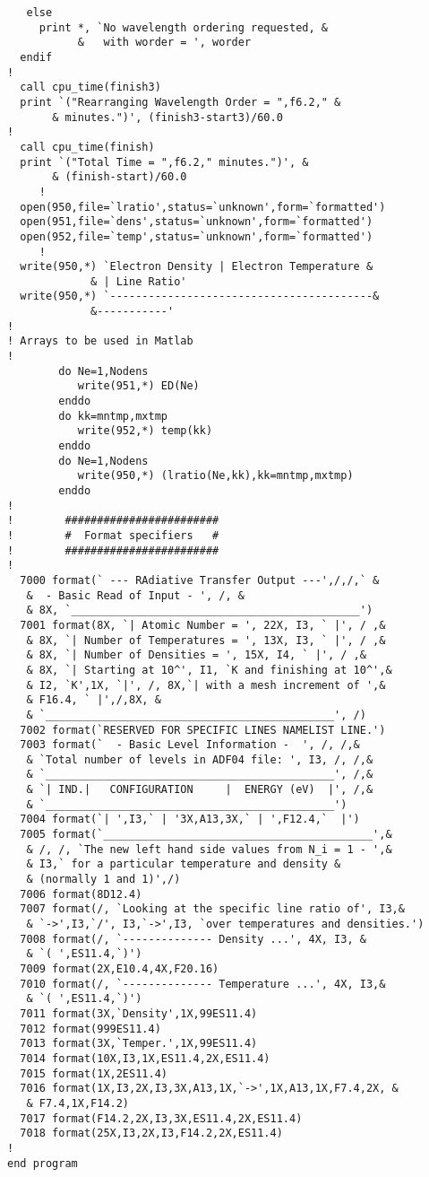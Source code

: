 \begin{appendices}
\begin{verbatim}
   else
     print *, `No wavelength ordering requested, &
           &   with worder = ', worder
  endif
!
  call cpu_time(finish3)
  print `("Rearranging Wavelength Order = ",f6.2," &
       & minutes.")', (finish3-start3)/60.0
!
  call cpu_time(finish)
  print `("Total Time = ",f6.2," minutes.")', &
       & (finish-start)/60.0
     !
  open(950,file=`lratio',status=`unknown',form=`formatted')
  open(951,file=`dens',status=`unknown',form=`formatted')
  open(952,file=`temp',status=`unknown',form=`formatted')
     !
  write(950,*) `Electron Density | Electron Temperature &
             & | Line Ratio'
  write(950,*) `-----------------------------------------&
             &-----------'
!
! Arrays to be used in Matlab
!
        do Ne=1,Nodens
           write(951,*) ED(Ne)
        enddo
        do kk=mntmp,mxtmp
           write(952,*) temp(kk)
        enddo
        do Ne=1,Nodens
           write(950,*) (lratio(Ne,kk),kk=mntmp,mxtmp)
        enddo
!
!        ########################
!        #  Format specifiers   #
!        ########################
!
  7000 format(` --- RAdiative Transfer Output ---',/,/,` &
   &  - Basic Read of Input - ', /, &
   & 8X, `_____________________________________________')
  7001 format(8X, `| Atomic Number = ', 22X, I3, ` |', / ,&
   & 8X, `| Number of Temperatures = ', 13X, I3, ` |', / ,&
   & 8X, `| Number of Densities = ', 15X, I4, ` |', / ,&
   & 8X, `| Starting at 10^', I1, `K and finishing at 10^',&
   & I2, `K',1X, `|', /, 8X,`| with a mesh increment of ',&
   & F16.4, ` |',/,8X, &
   & `_____________________________________________', /)
  7002 format(`RESERVED FOR SPECIFIC LINES NAMELIST LINE.')
  7003 format(`  - Basic Level Information -  ', /, /,&
   & `Total number of levels in ADF04 file: ', I3, /, /,&
   & `_____________________________________________', /,&
   & `| IND.|   CONFIGURATION     |  ENERGY (eV)  |', /,&
   & `_____________________________________________')
  7004 format(`| ',I3,` | '3X,A13,3X,` | ',F12.4,`  |')
  7005 format(`__________________________________________',&
   & /, /, `The new left hand side values from N_i = 1 - ',&
   & I3,` for a particular temperature and density &
   & (normally 1 and 1)',/)
  7006 format(8D12.4)
  7007 format(/, `Looking at the specific line ratio of', I3,&
   & `->',I3,`/', I3,`->',I3, `over temperatures and densities.')
  7008 format(/, `-------------- Density ...', 4X, I3, &
   & `( ',ES11.4,`)')
  7009 format(2X,E10.4,4X,F20.16)
  7010 format(/, `-------------- Temperature ...', 4X, I3,&
   & `( ',ES11.4,`)')
  7011 format(3X,`Density',1X,99ES11.4)
  7012 format(999ES11.4)
  7013 format(3X,`Temper.',1X,99ES11.4)
  7014 format(10X,I3,1X,ES11.4,2X,ES11.4)
  7015 format(1X,2ES11.4)
  7016 format(1X,I3,2X,I3,3X,A13,1X,`->',1X,A13,1X,F7.4,2X, &
   & F7.4,1X,F14.2)
  7017 format(F14.2,2X,I3,3X,ES11.4,2X,ES11.4)
  7018 format(25X,I3,2X,I3,F14.2,2X,ES11.4)
!
end program


\end{verbatim}
\end{appendices}
